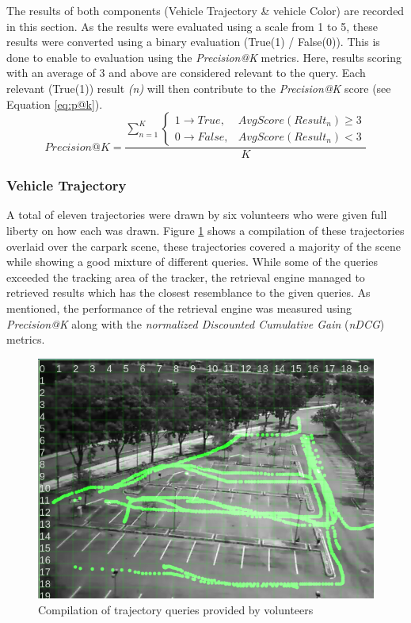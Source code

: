 The results of both components (Vehicle Trajectory \& vehicle Color) are recorded in this section. As the results were evaluated using a scale from 1 to 5, these results were converted using a binary evaluation (True(1) / False(0)). This is done to enable to evaluation using the \textit{Precision@K} metrics. Here, results scoring with an average of 3 and above are considered relevant to the query. Each relevant (True(1)) result \textit{(n)} will then contribute to the \textit{Precision@K} score (see Equation \ref{eq:p@k}). 
 \begin{equation}
\label{eq:p@k}
Precision@K =  \frac{\sum_{n=1}^K \begin{cases}1 \rightarrow True, & AvgScore(Result_n)\geq 3\\0 \rightarrow False, & AvgScore(Result_n)< 3 \end{cases}} {K}
\end{equation}

\subsubsection{Vehicle Trajectory}
A total of eleven trajectories were drawn by six volunteers who were given full liberty on how each was drawn. Figure \ref{fig:versionTwoTrajquery} shows a compilation of these trajectories overlaid over the carpark scene, these trajectories covered a majority of the scene while showing a good mixture of different queries.
While some of the queries exceeded the tracking area of the tracker, the retrieval engine managed to retrieved results which has the closest resemblance to the given queries. As mentioned, the performance of the retrieval engine was measured using \textit{Precision@K} along with the \textit{normalized Discounted Cumulative Gain} (\textit{nDCG}) metrics. 

\begin{figure}[!t]
  \centering
    \includegraphics[width=0.8\linewidth]{image/retrievalTwo/trajquery.png}
  \caption{Compilation of trajectory queries provided by volunteers}
  \label{fig:versionTwoTrajquery}
\end{figure}

